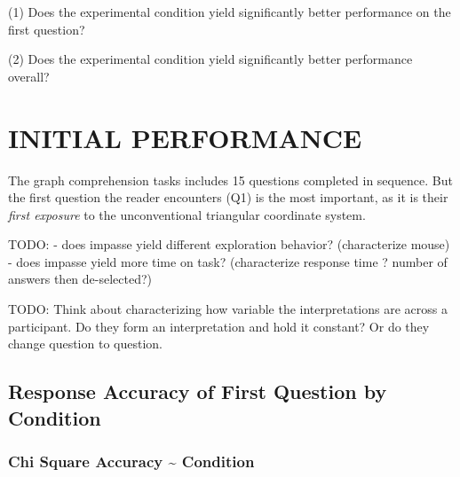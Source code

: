 \documentclass[
  letterpaper,
  DIV=11,
  numbers=noendperiod]{scrreprt}
\begin{document}
(1) Does the experimental condition yield significantly better
performance on the first question?

(2) Does the experimental condition yield significantly better
performance overall?

\hypertarget{initial-performance}{%
\section{INITIAL PERFORMANCE}\label{initial-performance}}

The graph comprehension tasks includes 15 questions completed in
sequence. But the first question the reader encounters (Q1) is the most
important, as it is their \emph{first exposure} to the unconventional
triangular coordinate system.

TODO: - does impasse yield different exploration behavior? (characterize
mouse) - does impasse yield more time on task? (characterize response
time ? number of answers then de-selected?)

TODO: Think about characterizing how variable the interpretations are
across a participant. Do they form an interpretation and hold it
constant? Or do they change question to question.

\hypertarget{response-accuracy-of-first-question-by-condition}{%
\subsection{Response Accuracy of First Question by
Condition}\label{response-accuracy-of-first-question-by-condition}}

\hypertarget{chi-square-accuracy-condition}{%
\subsubsection{Chi Square \textbar{} Accuracy \textasciitilde{}
Condition}\label{chi-square-accuracy-condition}}
\end{document}
